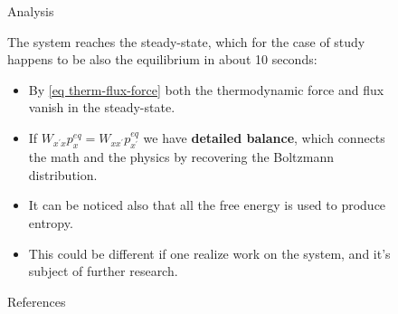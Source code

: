 \documentclass[final]{beamer}
\newlength{\sepwidth}
\newlength{\colwidth}
\newcommand{\separatorcolumn}{\begin{column}{\sepwidth}\end{column}}
\begin{document}
\begin{frame}[t]
\begin{columns}[t]
\begin{column}{\colwidth}
\end{column}

\separatorcolumn

\begin{column}{\colwidth}

\begin{block}{Analysis}
\begin{figure}
\begin{center}

\end{center}
\label{fig 2-state-system}
\caption{}
\end{figure}

The system reaches the steady-state, which for the case of study happens to be also the equilibrium in about 10 seconds:
%
\begin{itemize}
\item By \eqref{eq therm-flux-force} both the thermodynamic force and flux vanish in the steady-state.

\item If $W_{x^\prime x} p_x^{eq}=W_{xx^\prime}p_{x^\prime}^{eq}$ we have {\bf detailed balance}, which connects the math and the physics by recovering the Boltzmann distribution.

\item It can be noticed also that all the free energy is used to produce entropy.

\item This could be different if one realize work on the system, and it's subject of further research.
\end{itemize}
\end{block}
\begin{block}{References}

\nocite{*}
\footnotesize{}

\end{block}

\end{column}

\separatorcolumn
\end{columns}
\end{frame}
\end{document}
